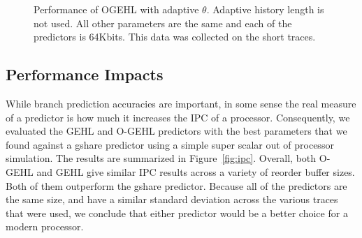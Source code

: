 \begin{figure}[h]
  \centering

  \caption{Performance of OGEHL with adaptive $\theta$.  Adaptive history length is not used. All other parameters are the same and each of the predictors is 64Kbits.  This data was collected on the short traces.}
 \label{fig:adaptT}
\end{figure}

\subsection{Performance Impacts}
While branch prediction accuracies are important, in some sense the real
measure of a predictor is how much it increases the IPC of a processor.
Consequently, we evaluated the GEHL and O-GEHL predictors with the best
parameters that we found against a gshare predictor using a simple super scalar
out of processor simulation.  The results are summarized in
Figure~\ref{fig:ipc}.  Overall, both O-GEHL and GEHL give similar IPC results
across a variety of reorder buffer sizes.  Both of them outperform the gshare
predictor.  Because all of the predictors are the same size, and have a similar
standard deviation across the various traces that were used, we conclude that
either predictor would be a better choice for a modern processor.

